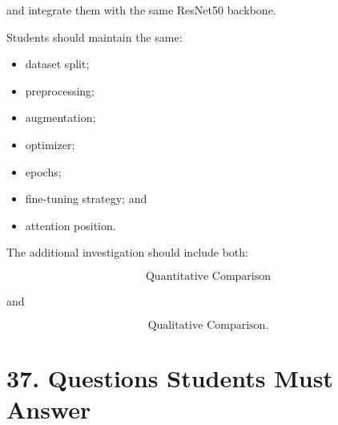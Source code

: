 \documentclass[10pt]{article}
\begin{document}
and integrate them with the same ResNet50 backbone.

Students should maintain the same:

\begin{itemize}

\item dataset split;

\item preprocessing;

\item augmentation;

\item optimizer;

\item epochs;

\item fine-tuning strategy; and

\item attention position.

\end{itemize}

The additional investigation should include both:

\[
\boxed{
\text{Quantitative Comparison}
}
\]

and

\[
\boxed{
\text{Qualitative Comparison}.
}
\]

\section*{37. Questions Students Must Answer}
\end{document}
